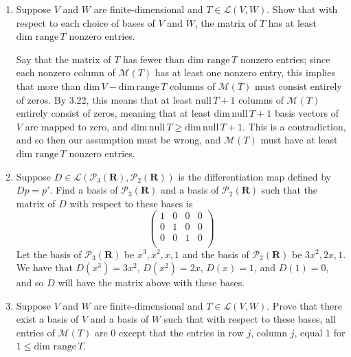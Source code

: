 \documentclass{book}
\begin{document}
\begin{enumerate}

\item Suppose \(V\) and \(W\) are finite-dimensional and \(T \in \mathcal{L}(V,W)\).  Show that with respect to each choice of bases of \(V\) and \(W\), the matrix of \(T\) has at least \(\textrm{dim range} \, T\) nonzero entries.

Say that the matrix of \(T\) has fewer than \(\textrm{dim range} \, T\) nonzero entries; since each nonzero column of \(\mathcal{M}(T)\) has at least one nonzero entry, this implies that more than \(\textrm{dim} \, V - \textrm{dim} \, \textrm{range} \, T\) columns of \(\mathcal{M}(T)\) must consist entirely of zeros.  By 3.22, this means that at least \(\textrm{null} \, T + 1\) columns of \(\mathcal{M}(T)\) entirely consist of zeros, meaning that at least \(\textrm{dim} \, \textrm{null} \, T + 1\) basis vectors of \(V\) are mapped to zero, and \(\textrm{dim} \, \textrm{null} \, T \geq \textrm{dim} \, \textrm{null} \, T + 1\).  This is a contradiction, and so then our assumption must be wrong, and \(\mathcal{M}(T)\) must have  at least \(\textrm{dim range} \, T\) nonzero entries.

\item Suppose \(D \in \mathcal{L}(\mathcal{P}_3(\textbf{R}),\mathcal{P}_2(\textbf{R}))\) is the differentiation map defined by \(Dp=p'\).  Find a basis of \(\mathcal{P}_3(\textbf{R})\) and a basis of \(\mathcal{P}_2(\textbf{R})\) such that the matrix of \(D\) with respect to these bases is
\begin{equation*}
\begin{pmatrix}
1 & 0 & 0 & 0 \\
0 & 1 & 0 & 0 \\
0 & 0 & 1 & 0 \\
\end{pmatrix}
\end{equation*}
Let the basis of \(\mathcal{P}_3(\textbf{R})\) be \(x^3,x^2,x,1\) and the basis of \(\mathcal{P}_2(\textbf{R})\) be \(3x^2,2x,1\).  We have that \(D(x^3)=3x^2\), \(D(x^2)=2x\), \(D(x)=1\), and \(D(1)=0\), and so \(D\) will have the matrix above with these bases.
\item Suppose \(V\) and \(W\) are finite-dimensional and \(T \in \mathcal{L}(V,W)\).  Prove that there exist a basis of \(V\) and a basis of \(W\) such that with respect to these bases, all entries of \(\mathcal{M}(T)\) are \(0\) except that the entries in row \(j\), column \(j\), equal 1 for \(1 \leq \textrm{dim range} \, T\).


\end{enumerate}
\end{document}
